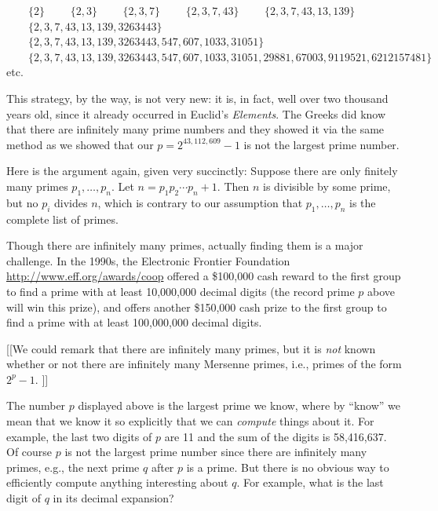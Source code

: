\documentclass[11pt,draft]{article}
\theoremstyle{plain}
\theoremstyle{definition}
\numberwithin{equation}{section}
\numberwithin{figure}{section}
\numberwithin{table}{section}
\begin{document}
$\mbox{}\qquad\{2\}$
\newline
$\mbox{}\qquad\{2,3\}$
\newline
$\mbox{}\qquad\{2,3, 7\}$
\newline
$\mbox{}\qquad\{2,3, 7, 43\}$
\newline
$\mbox{}\qquad\{2,3, 7, 43, 13, 139\}$
\newline
$\mbox{}\qquad\{2,3, 7, 43, 13, 139, 3263443\}$
\newline
$\mbox{}\qquad\{2,3, 7, 43, 13, 139, 3263443,  547, 607, 1033, 31051\}$
\newline
$\mbox{}\qquad\{2,3, 7, 43, 13, 139, 3263443,  547, 607, 1033, 31051, 29881, 67003,
9119521, 6212157481\}$
\newline
\mbox{}\qquad{}etc.

This strategy, by the way, is not very new: it is, in fact, well over
two thousand years old, since it already occurred in Euclid's {\em
  Elements}. The Greeks did know that there are infinitely many prime
numbers and they showed it via the same method as we showed that our
$p = 2^{43,112,609} - 1$ is not the largest prime number.

Here is the argument again, given very succinctly: Suppose there are
only finitely many primes $p_1, \ldots, p_n$.  Let $n=p_1 p_2 \cdots
p_n + 1$.  Then $n$ is divisible by some prime, but no $p_i$ divides
$n$, which is contrary to our assumption that $p_1, \ldots, p_n$ is
the complete list of primes.

Though there are infinitely many primes, actually finding them is a
major challenge.  In the 1990s, the Electronic Frontier Foundation
\url{http://www.eff.org/awards/coop} offered a \$100,000 cash reward
to the first group to find a prime with at least 10,000,000 decimal
digits (the record prime $p$ above will win this prize), and offers
another \$150,000 cash prize to the first group to find a prime with
at least 100,000,000 decimal digits.

[[We could remark that there are infinitely many primes, but it
is {\em not} known whether or not there are infinitely
many Mersenne primes, i.e., primes of the form $2^p - 1$. ]]

The number $p$ displayed above is the largest prime we know, where by
``know'' we mean that we know it so explicitly that we can {\em
  compute} things about it.  For example, the last two digits of $p$
are 11 and the sum of the digits is 58,416,637.  Of course $p$ is not
the largest prime number since there are infinitely many primes, e.g.,
the next prime $q$ after $p$ is a prime.  But there is no obvious way
to efficiently compute anything interesting about $q$.  For example,
what is the last digit of $q$ in its decimal expansion?
\end{document}
